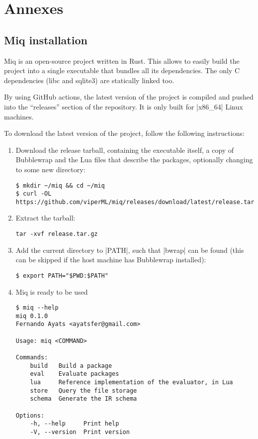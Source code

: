 \chapter{Annexes}

\section{Miq installation}

Miq is an open-source project written in Rust. This allows
to easily build the project into a single executable that
bundles all its dependencies. The only C dependencies (libc
and sqlite3) are statically linked too.

By using GitHub actions, the latest version of the project
is compiled and pushed into the ``releases'' section of the
repository. It is only built for |x86_64| Linux machines.

To download the latest version of the project, follow the
following instructions:

\begin{enumerate}
    \item Download the release tarball, containing the
    executable itself, a copy of Bubblewrap and the Lua
    files that describe the packages, optionally changing to
    some new directory:
\begin{verbatim}
$ mkdir ~/miq && cd ~/miq
$ curl -OL https://github.com/viperML/miq/releases/download/latest/release.tar.gz
\end{verbatim}

    \item Extract the tarball:
\begin{verbatim}
tar -xvf release.tar.gz
\end{verbatim}

    \item Add the current directory to |PATH|, such that
    |bwrap| can be found (this can be skipped if the host
    machine has Bubblewrap installed):
\begin{verbatim}
$ export PATH="$PWD:$PATH"
\end{verbatim}

    \item Miq is ready to be used
\begin{verbatim}
$ miq --help
miq 0.1.0
Fernando Ayats <ayatsfer@gmail.com>

Usage: miq <COMMAND>

Commands:
    build   Build a package
    eval    Evaluate packages
    lua     Reference implementation of the evaluator, in Lua
    store   Query the file storage
    schema  Generate the IR schema

Options:
    -h, --help     Print help
    -V, --version  Print version
\end{verbatim}

\end{enumerate}




